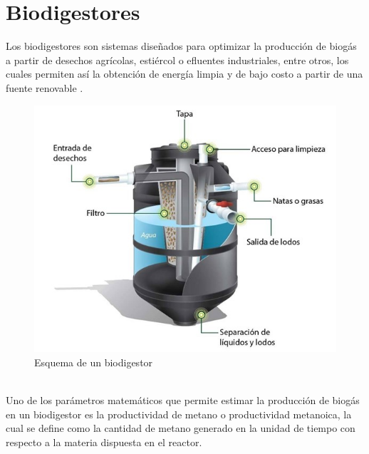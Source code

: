 \documentclass[a4paper,11pt]{article}
\begin{document}
\section{Biodigestores}
Los biodigestores son sistemas diseñados para optimizar la producción de biogás a partir de desechos agrícolas, estiércol o efluentes industriales, entre otros, los cuales permiten así la obtención de energía limpia y de bajo costo a partir de una fuente renovable \cite{RivasSolano2010}.
\\
\begin{figure}[h]
\includegraphics[scale=.75]{ImagenBiodigestor}
\caption{Esquema de un biodigestor \cite{Autores2013}}
\label{Figura 1}
\end{figure}
\\
Uno de los parámetros matemáticos que permite estimar la producción de biogás en un biodigestor es la productividad de metano o productividad metanoica, la cual se define como la cantidad de metano generado en la unidad de tiempo con respecto a la materia dispuesta en el reactor. 



\end{document}
